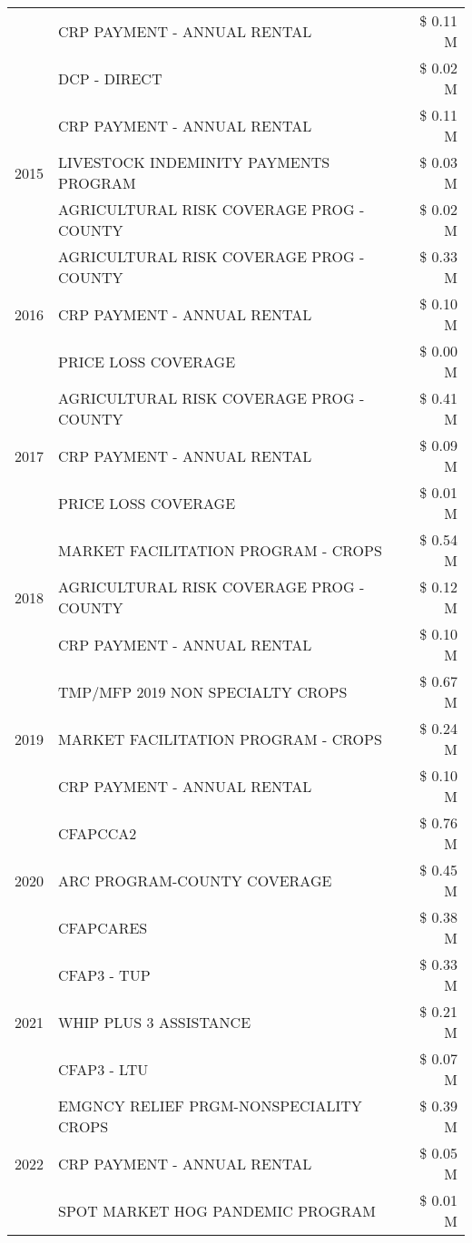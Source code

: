 \begin{tabular}{llr}
 & CRP PAYMENT - ANNUAL RENTAL & \$ 0.11 M \\
 & DCP - DIRECT & \$ 0.02 M \\
\cline{1-3}
\multirow[t]{3}{*}{2015} & CRP PAYMENT - ANNUAL RENTAL & \$ 0.11 M \\
 & LIVESTOCK INDEMINITY PAYMENTS PROGRAM & \$ 0.03 M \\
 & AGRICULTURAL RISK COVERAGE PROG - COUNTY & \$ 0.02 M \\
\cline{1-3}
\multirow[t]{3}{*}{2016} & AGRICULTURAL RISK COVERAGE PROG - COUNTY & \$ 0.33 M \\
 & CRP PAYMENT - ANNUAL RENTAL & \$ 0.10 M \\
 & PRICE LOSS COVERAGE & \$ 0.00 M \\
\cline{1-3}
\multirow[t]{3}{*}{2017} & AGRICULTURAL RISK COVERAGE PROG - COUNTY & \$ 0.41 M \\
 & CRP PAYMENT - ANNUAL RENTAL & \$ 0.09 M \\
 & PRICE LOSS COVERAGE & \$ 0.01 M \\
\cline{1-3}
\multirow[t]{3}{*}{2018} & MARKET FACILITATION PROGRAM - CROPS & \$ 0.54 M \\
 & AGRICULTURAL RISK COVERAGE PROG - COUNTY & \$ 0.12 M \\
 & CRP PAYMENT - ANNUAL RENTAL & \$ 0.10 M \\
\cline{1-3}
\multirow[t]{3}{*}{2019} & TMP/MFP 2019 NON SPECIALTY CROPS & \$ 0.67 M \\
 & MARKET FACILITATION PROGRAM - CROPS & \$ 0.24 M \\
 & CRP PAYMENT - ANNUAL RENTAL & \$ 0.10 M \\
\cline{1-3}
\multirow[t]{3}{*}{2020} & CFAPCCA2 & \$ 0.76 M \\
 & ARC PROGRAM-COUNTY COVERAGE & \$ 0.45 M \\
 & CFAPCARES & \$ 0.38 M \\
\cline{1-3}
\multirow[t]{3}{*}{2021} & CFAP3 - TUP & \$ 0.33 M \\
 & WHIP PLUS 3 ASSISTANCE & \$ 0.21 M \\
 & CFAP3 - LTU & \$ 0.07 M \\
\cline{1-3}
\multirow[t]{3}{*}{2022} & EMGNCY RELIEF PRGM-NONSPECIALITY CROPS & \$ 0.39 M \\
 & CRP PAYMENT - ANNUAL RENTAL & \$ 0.05 M \\
 & SPOT MARKET HOG PANDEMIC PROGRAM & \$ 0.01 M \\
\cline{1-3}
\bottomrule
\end{tabular}
